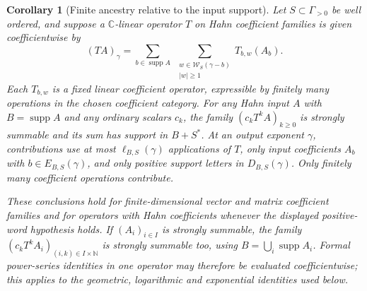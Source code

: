 \documentclass[11pt,letterpaper]{article}
\newtheorem{corollary}[corollary]{Corollary}
\theoremstyle{definition}
\theoremstyle{remark}
\newcommand{\C}{\mathbb C}
\newcommand{\N}{\mathbb N}
\newcommand{\supp}{\operatorname{supp}}
\newcommand{\word}{\mathcal W}
\numberwithin{equation}{section}
\begin{document}
\begin{corollary}[Finite ancestry relative to the input support]
\label{dyn:cor:ancestry}
Let $S\subset\Gamma_{>0}$ be well ordered, and suppose a $\C$-linear
operator $T$ on Hahn coefficient families is given coefficientwise by
\[
 (TA)_\gamma
 =\sum_{b\in\supp A}\;
   \sum_{\substack{w\in\word_S(\gamma-b)\\ |w|\ge1}}
       T_{b,w}(A_b).
\]
Each $T_{b,w}$ is a fixed linear coefficient operator, expressible by
finitely many operations in the chosen coefficient category. For any Hahn
input $A$ with $B=\supp A$ and any ordinary scalars $c_k$, the family
$(c_kT^kA)_{k\ge0}$ is strongly summable and its sum has support in
$B+S^{*}$. At an output exponent $\gamma$, contributions use at most
$\ell_{B,S}(\gamma)$ applications of $T$, only input coefficients $A_b$
with $b\in E_{B,S}(\gamma)$, and only positive support letters in
$D_{B,S}(\gamma)$. Only finitely many coefficient operations contribute.

These conclusions hold for finite-dimensional vector and matrix
coefficient families and for operators with Hahn coefficients whenever
the displayed positive-word hypothesis holds. If $(A_i)_{i\in I}$ is
strongly summable, the family $(c_kT^kA_i)_{(i,k)\in I\times\N}$ is
strongly summable too, using $B=\bigcup_i\supp A_i$. Formal power-series
identities in one operator may therefore be evaluated coefficientwise;
this applies to the geometric, logarithmic and exponential identities used
below.
\end{corollary}
\end{document}
